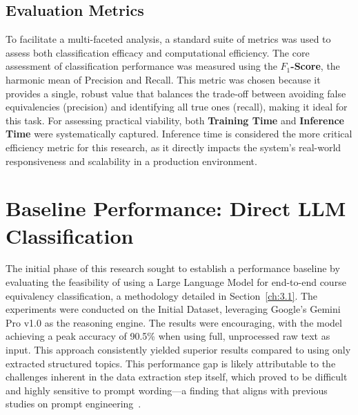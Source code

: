 \subsection{Evaluation Metrics}\label{ch:4.1.3}
To facilitate a multi-faceted analysis, a standard suite of metrics was used to assess both classification efficacy and computational efficiency. The core assessment of classification performance was measured using the \textbf{\(F_1\)-Score}, the harmonic mean of Precision and Recall. This metric was chosen because it provides a single, robust value that balances the trade-off between avoiding false equivalencies (precision) and identifying all true ones (recall), making it ideal for this task. For assessing practical viability, both \textbf{Training Time} and \textbf{Inference Time} were systematically captured. Inference time is considered the more critical efficiency metric for this research, as it directly impacts the system's real-world responsiveness and scalability in a production environment.

\section{Baseline Performance: Direct LLM Classification}\label{ch:4.2}
The initial phase of this research sought to establish a performance baseline by evaluating the feasibility of using a Large Language Model for end-to-end course equivalency classification, a methodology detailed in Section~\ref{ch:3.1}. The experiments were conducted on the Initial Dataset, leveraging Google's Gemini Pro v1.0 as the reasoning engine. The results were encouraging, with the model achieving a peak accuracy of 90.5\% when using full, unprocessed raw text as input. This approach consistently yielded superior results compared to using only extracted structured topics. This performance gap is likely attributable to the challenges inherent in the data extraction step itself, which proved to be difficult and highly sensitive to prompt wording---a finding that aligns with previous studies on prompt engineering~\cite{Sclar2023QuantifyingLM,Errica2024WhatDI,Chen2024LLMAA,Cheung2024ARC,Gerych2024WhoKT}.

